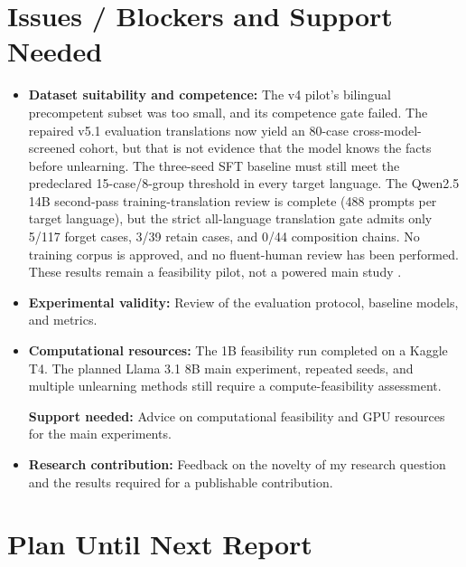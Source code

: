 \documentclass[10pt,a4paper]{article}
\begin{document}
\section{Issues / Blockers and Support Needed}

\begin{itemize}

    \item \textbf{Dataset suitability and competence:}
    The v4 pilot's bilingual precompetent subset was too small,
    and its competence gate failed. The repaired v5.1 evaluation
    translations now yield an 80-case cross-model-screened cohort, but
    that is not evidence that the model knows the facts before
    unlearning. The three-seed SFT baseline must still meet the
    predeclared 15-case/8-group threshold in every target
    language. The Qwen2.5 14B second-pass training-translation review is complete (488 prompts per target language), but the strict all-language translation gate admits only 5/117 forget cases, 3/39 retain cases, and 0/44 composition chains. No training corpus is approved, and no fluent-human review has been performed. These results remain a feasibility pilot,
    not a powered main study \cite{gu2026synthworlds}.

    \item \textbf{Experimental validity:}
    Review of the evaluation protocol,
    baseline models, and metrics.

    \item \textbf{Computational resources:}
    The 1B feasibility run completed on a Kaggle T4.
    The planned Llama 3.1 8B main experiment, repeated
    seeds, and multiple unlearning methods still require
    a compute-feasibility assessment.

    \textbf{Support needed:}
    Advice on computational feasibility and GPU resources for the main experiments.

    \item \textbf{Research contribution:}
    Feedback on the novelty of my research question and the results required for a publishable contribution.

\end{itemize}

\section{Plan Until Next Report}
\end{document}
